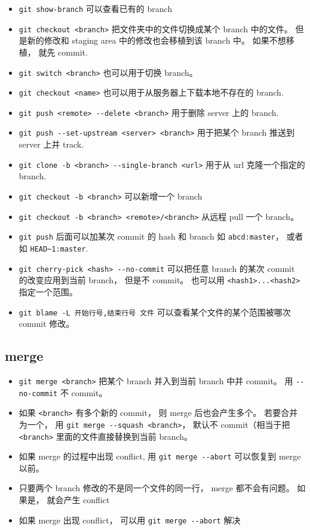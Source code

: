 \begin{itemize}
\item \verb`git show-branch` 可以查看已有的 branch 
\item \verb`git checkout <branch>` 把文件夹中的文件切换成某个 branch 中的文件。 但是新的修改和 staging area 中的修改也会移植到该 branch 中。 如果不想移植， 就先 commit.
\item \verb`git switch <branch>` 也可以用于切换 branch。
\item \verb`git checkout <name>` 也可以用于从服务器上下载本地不存在的 branch.
\item \verb`git push <remote> --delete <branch>` 用于删除 server 上的 branch.
\item \verb`git push --set-upstream <server> <branch>` 用于把某个 branch 推送到 server 上并 track.
\item \verb`git clone -b <branch> --single-branch <url>` 用于从 url 克隆一个指定的 branch.
\item \verb`git checkout -b <branch>` 可以新增一个 branch
\item \verb`git checkout -b <branch> <remote>/<branch>` 从远程 pull 一个 branch。
\item \verb`git push` 后面可以加某次 commit 的 hash 和 branch 如 \verb`abcd:master`， 或者如 \verb`HEAD~1:master`.
\item \verb`git cherry-pick <hash> --no-commit` 可以把任意 branch 的某次 commit 的改变应用到当前 branch， 但是不 commit。 也可以用 \verb`<hash1>...<hash2>` 指定一个范围。
\item \verb`git blame -L 开始行号,结束行号 文件`  可以查看某个文件的某个范围被哪次 commit 修改。
\end{itemize}

\subsection{merge}
\begin{itemize}
\item \verb`git merge <branch>` 把某个 branch 并入到当前 branch 中并 commit。 用 \verb`--no-commit` 不 commit。
\item 如果 \verb`<branch>` 有多个新的 commit， 则 merge 后也会产生多个。 若要合并为一个， 用 \verb`git merge --squash <branch>`， 默认不 commit（相当于把 \verb`<branch>` 里面的文件直接替换到当前 branch。
\item 如果 merge 的过程中出现 conflict, 用 \verb`git merge --abort` 可以恢复到 merge 以前。
\item 只要两个 branch 修改的不是同一个文件的同一行， merge 都不会有问题。 如果是， 就会产生 conflict
\item 如果 merge 出现 conflict， 可以用 \verb`git merge --abort` 解决
\end{itemize}


